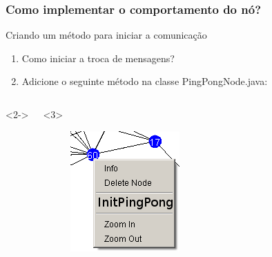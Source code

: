 \documentclass{beamer}
\begin{document}
\begin{frame}
\tiny
	
\end{frame}

\begin{frame}
	\frametitle{Como implementar o comportamento do nó?}
	
	\begin{block}{Criando um método para iniciar a comunicação}
		\begin{enumerate}
			\item Como iniciar a troca de mensagens?
			\item Adicione o seguinte método na classe PingPongNode.java:
		\end{enumerate}
			
	\end{block}	

\begin{columns}[c]<2-> %


	

	\begin{exampleblock}{}<3>
		\begin{figure}[t]
			\includegraphics[width=1\linewidth]{img/popup}
		\end{figure}
	\end{exampleblock}

\end{columns}
\end{frame}
\end{document}
